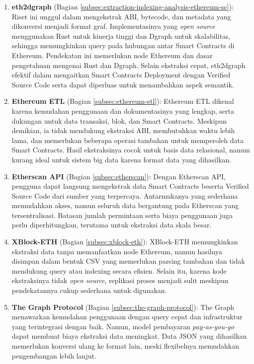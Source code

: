 \begin{enumerate}
	\item \textbf{eth2dgraph} \parencite{aimar2023extraction} (Bagian \ref{subsec:extraction-indexing-analysis-ethereum-sc}): Riset ini unggul dalam mengekstrak ABI, bytecode, dan metadata yang dikonversi menjadi format graf. Implementasinya yang \textit{open source} menggunakan Rust untuk kinerja tinggi dan Dgraph untuk skalabilitas, sehingga memungkinkan query pada hubungan antar Smart Contracts di Ethereum. Pendekatan ini memerlukan node Ethereum dan dasar pengetahuan mengenai Rust dan Dgraph. Selain ekstraksi cepat, eth2dgraph efektif dalam mengaitkan Smart Contracts Deployment dengan Verified Source Code serta dapat diperluas untuk menambahkan aspek semantik.

	\item \textbf{Ethereum ETL} \parencite{ethereum_etl} (Bagian \ref{subsec:ethereum-etl}): Ethereum ETL dikenal karena kemudahan penggunaan dan dokumentasinya yang lengkap, serta dukungan untuk data transaksi, blok, dan Smart Contracts. Meskipun demikian, ia tidak mendukung ekstraksi ABI, membutuhkan waktu lebih lama, dan memerlukan beberapa operasi tambahan untuk memperoleh data Smart Contracts. Hasil ekstraksinya cocok untuk basis data relasional, namun kurang ideal untuk sistem big data karena format data yang dihasilkan.

	\item \textbf{Etherscan API} \parencite{etherscan2024} (Bagian \ref{subsec:etherscan}): Dengan Etherscan API, pengguna dapat langsung mengekstrak data Smart Contracts beserta Verified Source Code dari sumber yang terpercaya. Antarmukanya yang sederhana memudahkan akses, namun seluruh data bergantung pada Etherscan yang tersentralisasi. Batasan jumlah permintaan serta biaya penggunaan juga perlu diperhitungkan, terutama untuk ekstraksi data skala besar.

	\item \textbf{XBlock-ETH} \parencite{zheng2020xblock} (Bagian \ref{subsec:xblock-eth}): XBlock-ETH memungkinkan ekstraksi data tanpa memanfaatkan node Ethereum, namun hasilnya disimpan dalam bentuk CSV yang memerlukan parsing tambahan dan tidak mendukung query atau indexing secara efisien. Selain itu, karena kode ekstraksinya tidak \textit{open source}, replikasi proses menjadi sulit meskipun pendekatannya cukup sederhana untuk digunakan.

	\item \textbf{The Graph Protocol} \parencite{TheGraphDocs} (Bagian \ref{subsec:the-graph-protocol}): The Graph menawarkan kemudahan penggunaan dengan query cepat dan infrastruktur yang terintegrasi dengan baik. Namun, model pembayaran \textit{pay-as-you-go} dapat membuat biaya ekstraksi data meningkat. Data JSON yang dihasilkan memerlukan konversi ulang ke format lain, meski flexibelnya memudahkan pengembangan lebih lanjut.


\end{enumerate}
